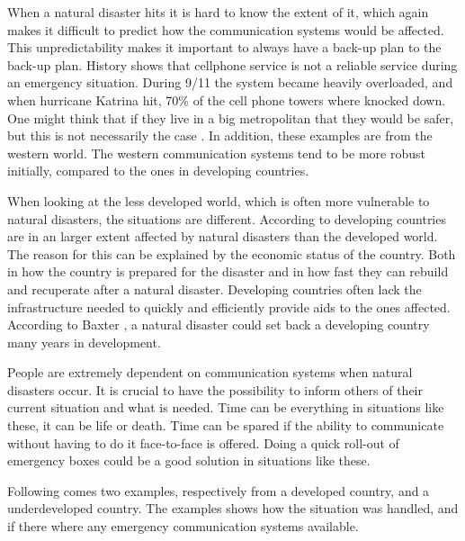 When a natural disaster hits it is hard to know the extent of it, which  again makes it difficult to predict how the communication systems would be affected. This unpredictability makes it important to always have a back-up plan to the back-up plan. History shows that cellphone service is not a reliable service during an emergency situation. During 9/11 the system became heavily overloaded, and when hurricane Katrina hit, 70\% of the cell phone towers where knocked down. One might think that if they live in a big metropolitan that they would be safer, but this is not necessarily the case \cite{disasterComm}. In addition, these examples are from the western world. The western communication systems tend to be more robust initially, compared to the ones in developing countries. 

When looking at the less developed world, which is often more vulnerable to natural disasters, the situations are different. According to \cite{DevelopingWorld, 360} developing countries are in an larger extent affected by natural disasters than the developed world. The reason for this can be explained by the economic status of the country. Both in how the country is prepared for the disaster and in how fast they can rebuild and recuperate after a natural disaster. Developing countries often lack the infrastructure needed to quickly and efficiently provide aids to the ones affected. According to Baxter \cite{360}, a natural disaster could set back a developing country many years in development.  

People are extremely dependent on communication systems when natural disasters occur. It is crucial to have the possibility to inform others of their current situation and what is needed. Time can be everything in situations like these, it can be life or death. Time can be spared if the ability to communicate without having to do it face-to-face is offered. Doing a quick roll-out of emergency boxes could be a good solution in situations like these. 

Following comes two examples, respectively from a developed country, and a underdeveloped country. The examples shows how the situation was handled, and if there where any emergency communication systems available. 

